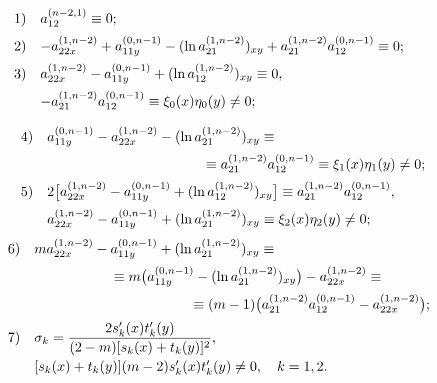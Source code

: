 \begin{equation}
\begin{array}{ll}
1)&  a_{12}^{(n-2,1)}\equiv0; 
\\[2mm]
2) & -a_{22x}^{(1,n-2)}+a_{11y}^{(0,n-1)}-(\ln a_{21}^{(1,n-2)})_{xy}+a_{21}^{(1,n-2)}a_{12}^{(0,n-1)}\equiv0;  
\\[2mm]
3) & a_{22x}^{(1,n-2)}-a_{11y}^{(0,n-1)}+(\ln a_{12}^{(1,n-2)})_{xy}\equiv0,
\\[2mm]
   & -a_{21}^{(1,n-2)}a_{12}^{(0,n-1)}\equiv\xi_{0}(x)\eta_{0}(y)\neq0;
\end{array}
\hspace{1.3cm}   
\end{equation}

\begin{equation}
\label{soz:eq22}
\begin{array}{ll}
4) & a_{11y}^{(0,n-1)}-a_{22x}^{(1,n-2)}-(\ln a_{21}^{(1,n-2)})_{xy}\equiv 
\\[2mm]
   & \hspace{4cm} \equiv a_{21}^{(1,n-2)}a_{12}^{(0,n-1)}\equiv\xi_{1}(x)\eta_{1}(y)\neq0;
\\[2mm]
5) & 2\bigl[a_{22x}^{(1,n-2)}-a_{11y}^{(0,n-1)}+(\ln a_{12}^{(1,n-2)})_{xy}\bigr]\equiv a_{21}^{(1,n-2)}a_{12}^{(0,n-1)},
\\[2mm]
   & a_{22x}^{(1,n-2)}-a_{11y}^{(0,n-1)}+(\ln a_{21}^{(1,n-2)})_{xy}\equiv\xi_{2}(x)\eta_{2}(y)\neq0;
\end{array}
\hspace{.6cm}  
\end{equation}
\begin{equation}
\begin{array}{ll}
6) & ma_{22x}^{(1,n-2)}-a_{11y}^{(0,n-1)}+(\ln a_{21}^{(1,n-2)})_{xy}\equiv
\\[2mm]
   &  \hspace{2cm} \equiv m \bigl(a_{11y}^{(0,n-1)}-(\ln a_{21}^{(1,n-2)})_{xy} \bigr)-a_{22x}^{(1,n-2)}\equiv
\\[2mm]
   & \hspace{4cm} \equiv(m-1) \bigl(a_{21}^{(1,n-2)}a_{12}^{(0,n-1)}-a_{22x}^{(1,n-2)}\bigr);
\\[2mm]
7) & \sigma_{k}=\dfrac{2s' _{k}(x)t' _{k}(y)}{(2-m)[s_{k}(x)+t_{k}(y)]^{2}},
\\[3mm]
   & [s_{k}(x)+t_{k}(y)](m-2)s' _{k}(x)t' _{k}(y)\neq0,\quad  k=1, 2.
\end{array}
\hspace{.8cm}  
\end{equation}

